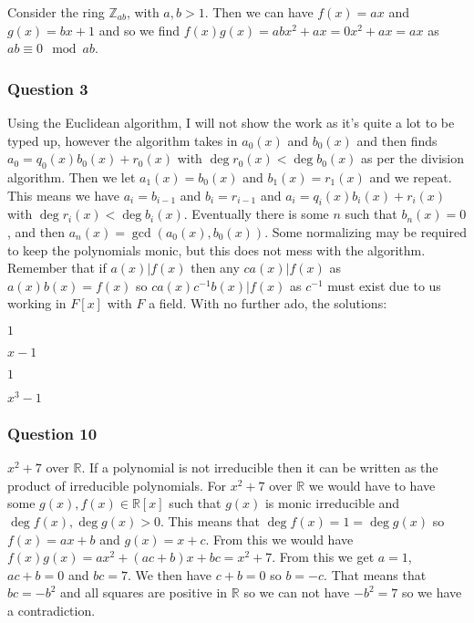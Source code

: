 \documentclass{article}
\begin{document}
 Consider the ring $\mathbb Z_{ab}$, with $a,b > 1$. Then we can have $f(x) = ax$ and $g(x) = bx+1$ and so we find $f(x)g(x) = abx^2+ax = 0x^2+ax = ax$ as $ab \equiv 0\mod ab$.

\subsubsection{Question 3}
Using the Euclidean algorithm, I will not show the work as it's quite a lot to be typed up, however the algorithm takes in $a_0(x)$ and $b_0(x)$ and then finds $a_0 = q_0(x)b_0(x)+r_0(x)$ with $\deg r_0(x) < \deg b_0(x)$ as per the division algorithm. Then we let $a_1(x) = b_0(x)$ and $b_1(x) = r_1(x)$ and we repeat. This means we have $a_i = b_{i-1}$ and $b_i = r_{i-1}$ and $a_i =q_i(x)b_i(x)+r_i(x)$ with $\deg r_i(x) < \deg b_i(x)$. Eventually there is some $n$ such that $b_n(x) = 0$, and then $a_n(x) = \gcd(a_0(x),b_0(x))$. Some normalizing may be required to keep the polynomials monic, but this does not mess with the algorithm. Remember that if $a(x)|f(x)$ then any $ca(x)|f(x)$ as $a(x)b(x) = f(x)$ so $ca(x)c^{-1}b(x) | f(x)$ as $c^{-1}$ must exist due to us working in $F[x]$ with $F$ a field. With no further ado, the solutions:

 $1$

 $x-1$

 $1$

 $x^3-1$

\subsubsection{Question 10}

 $x^2+7$ over $\mathbb R$.
If a polynomial is not irreducible then it can be written as the product of irreducible polynomials. For $x^2 + 7$ over $\mathbb R$ we would have to have some $g(x),f(x)\in\mathbb R[x]$ such that $g(x)$ is monic irreducible and $\deg f(x),\deg g(x) > 0$. This means that $\deg f(x) = 1 = \deg g(x)$ so $f(x) = ax+b$ and $g(x) = x+c$. From this we would have $f(x)g(x) = ax^2+(ac+b)x + bc = x^2+7$. From this we get $a= 1$, $ac+b = 0$ and $bc = 7$. We then have $c+b = 0$ so $b=-c$.  That means that $bc = -b^2$ and all squares are positive in $\mathbb R$ so we can not have $-b^2 = 7$ so we have a contradiction.
\end{document}
